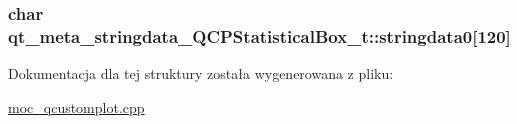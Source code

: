 \subsubsection[{\texorpdfstring{stringdata0}{stringdata0}}]{\setlength{\rightskip}{0pt plus 5cm}char qt\+\_\+meta\+\_\+stringdata\+\_\+\+Q\+C\+P\+Statistical\+Box\+\_\+t\+::stringdata0\mbox{[}120\mbox{]}}\hypertarget{structqt__meta__stringdata___q_c_p_statistical_box__t_a1cda43a559b6896254cc1ae2ff88fe83}{}\label{structqt__meta__stringdata___q_c_p_statistical_box__t_a1cda43a559b6896254cc1ae2ff88fe83}


Dokumentacja dla tej struktury została wygenerowana z pliku\+:\begin{DoxyCompactItemize}
\item 
\hyperlink{moc__qcustomplot_8cpp}{moc\+\_\+qcustomplot.\+cpp}\end{DoxyCompactItemize}
